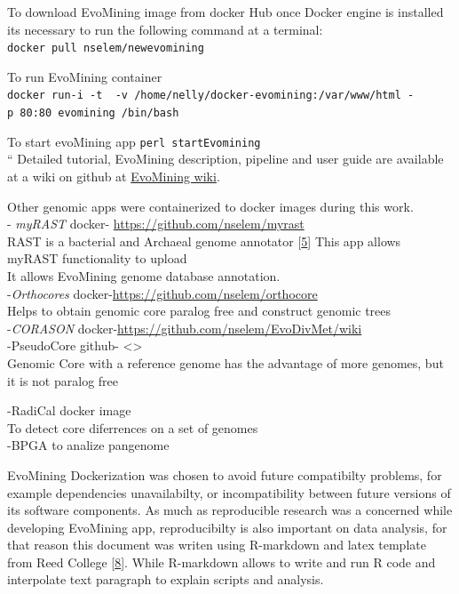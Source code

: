 \documentclass[12pt,twoside]{reedthesis}
\begin{document}
  To download EvoMining image from docker Hub once Docker engine is
  installed its necessary to run the following command at a terminal:\\
  \texttt{docker\ pull\ nselem/newevomining}
  
  To run EvoMining container\\
  \texttt{docker\ run-i\ -t\ \ -v\ /home/nelly/docker-evomining:/var/www/html\ -p\ 80:80\ evomining\ /bin/bash}
  
  To start evoMining app \texttt{perl\ startEvomining}\\
  `` Detailed tutorial, EvoMining description, pipeline and user guide are
  available at a wiki on github at
  \href{https://github.com/nselem/EvoMining/wiki}{EvoMining wiki}.
  
  Other genomic apps were containerized to docker images during this
  work.\\
  - \emph{myRAST} docker- \url{https://github.com/nselem/myrast}\\
  RAST is a bacterial and Archaeal genome annotator
  {[}\protect\hyperlink{ref-aziz_rast_2008}{5}{]} This app allows myRAST
  functionality to upload\\
  It allows EvoMining genome database annotation.\\
  -\emph{Orthocores} docker-\url{https://github.com/nselem/orthocore}\\
  Helps to obtain genomic core paralog free and construct genomic trees\\
  -\emph{CORASON} docker-\url{https://github.com/nselem/EvoDivMet/wiki}\\
  -PseudoCore github- \textless{}\textgreater{}\\
  Genomic Core with a reference genome has the advantage of more genomes,
  but it is not paralog free
  
  -RadiCal docker image\\
  To detect core diferrences on a set of genomes\\
  -BPGA to analize pangenome
  
  EvoMining Dockerization was chosen to avoid future compatibilty
  problems, for example dependencies unavailabilty, or incompatibility
  between future versions of its software components. As much as
  reproducible research was a concerned while developing EvoMining app,
  reproducibilty is also important on data analysis, for that reason this
  document was writen using R-markdown and latex template from Reed
  College {[}\protect\hyperlink{ref-chesterismay_updated_2016}{8}{]}.
  While R-markdown allows to write and run R code and interpolate text
  paragraph to explain scripts and analysis.
  
\end{document}
